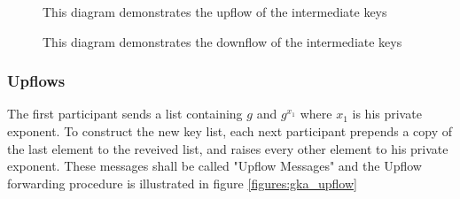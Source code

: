 \begin{figure}[t]
  \begin{minipage}{0.49\textwidth}
    \caption[GKA intermediate keys upflow]{This diagram demonstrates the upflow of the intermediate keys}
    \label{figures:gka_upflow}
  \end{minipage}
  \begin{minipage}{0.49\textwidth}
    \caption[GKA intermediate keys downflow]{This diagram demonstrates the downflow of the intermediate keys}
    \label{figures:gka_downflow}
  \end{minipage}
\end{figure}

\subsubsection{Upflows}
The first participant sends a list containing $g$ and $g^{x_1}$ where $x_1$ is his private exponent. To construct the new key list, each next participant prepends a copy of the last element to the reveived list, and raises every other element to his private exponent. These messages shall be called "Upflow Messages" and the Upflow forwarding procedure is illustrated in figure \ref{figures:gka_upflow}

